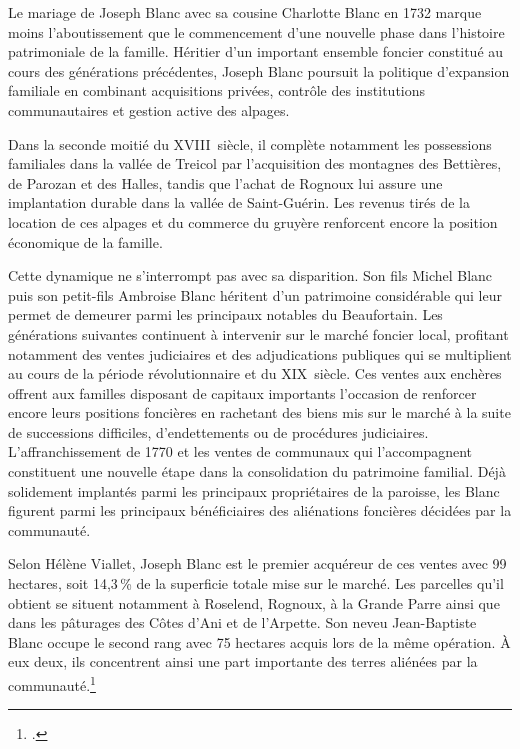\documentclass[12pt,a4paper]{report}
\begin{document}
	Le mariage de Joseph Blanc avec sa cousine Charlotte Blanc en 1732 marque moins l'aboutissement que le commencement d'une nouvelle phase dans l'histoire patrimoniale de la famille. Héritier d'un important ensemble foncier constitué au cours des générations précédentes, Joseph Blanc poursuit la politique d'expansion familiale en combinant acquisitions privées, contrôle des institutions communautaires et gestion active des alpages.
	
	Dans la seconde moitié du XVIII\ieme\ siècle, il complète notamment les possessions familiales dans la vallée de Treicol par l'acquisition des montagnes des Bettières, de Parozan et des Halles, tandis que l'achat de Rognoux lui assure une implantation durable dans la vallée de Saint-Guérin. Les revenus tirés de la location de ces alpages et du commerce du gruyère renforcent encore la position économique de la famille.
	
	Cette dynamique ne s'interrompt pas avec sa disparition. Son fils Michel Blanc puis son petit-fils Ambroise Blanc héritent d'un patrimoine considérable qui leur permet de demeurer parmi les principaux notables du Beaufortain. Les générations suivantes continuent à intervenir sur le marché foncier local, profitant notamment des ventes judiciaires et des adjudications publiques qui se multiplient au cours de la période révolutionnaire et du XIX\ieme\ siècle. Ces ventes aux enchères offrent aux familles disposant de capitaux importants l'occasion de renforcer encore leurs positions foncières en rachetant des biens mis sur le marché à la suite de successions difficiles, d'endettements ou de procédures judiciaires.
	L'affranchissement de 1770 et les ventes de communaux qui l'accompagnent constituent une nouvelle étape dans la consolidation du patrimoine familial. Déjà solidement implantés parmi les principaux propriétaires de la paroisse, les Blanc figurent parmi les principaux bénéficiaires des aliénations foncières décidées par la communauté.
	
	Selon Hélène Viallet, Joseph Blanc est le premier acquéreur de ces ventes avec 99 hectares, soit 14,3\,\% de la superficie totale mise sur le marché. Les parcelles qu'il obtient se situent notamment à Roselend, Rognoux, à la Grande Parre ainsi que dans les pâturages des Côtes d'Ani et de l'Arpette. Son neveu Jean-Baptiste Blanc occupe le second rang avec 75 hectares acquis lors de la même opération. À eux deux, ils concentrent ainsi une part importante des terres aliénées par la communauté.\footcite[p.~266-267]{Viallet1990Blanc}
	
\end{document}
